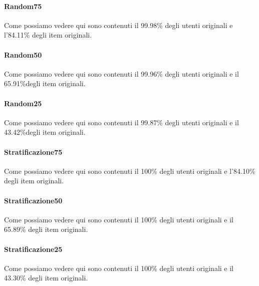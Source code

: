 \paragraph*{\textbf{Random75}}
Come possiamo vedere qui sono contenuti il 99.98\% degli utenti originali e l'84.11\% degli item originali.

\paragraph*{\textbf{Random50}}
Come possiamo vedere qui sono contenuti il 99.96\% degli utenti originali e il 65.91\%degli item originali.

\paragraph*{\textbf{Random25}}
Come possiamo vedere qui sono contenuti il 99.87\% degli utenti originali e il 43.42\%degli item originali.

\paragraph*{\textbf{Stratificazione75}}
Come possiamo vedere qui sono contenuti il 100\% degli utenti originali e l'84.10\% degli item originali.

\paragraph*{\textbf{Stratificazione50}}
Come possiamo vedere qui sono contenuti il 100\% degli utenti originali e il 65.89\% degli item originali.

\paragraph*{\textbf{Stratificazione25}}
Come possiamo vedere qui sono contenuti il 100\% degli utenti originali e il 43.30\% degli item originali.